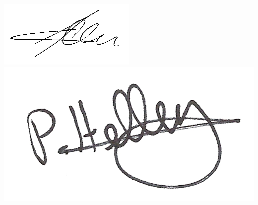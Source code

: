 \documentclass[a4paper,10pt]{article}
\begin{document}
\begin{flushright}
\includegraphics[width=.30\textwidth]{sign_clauss.jpg}
\includegraphics[width=.30\textwidth]{sign_helluy.jpg} 
\end{flushright}
%
%
\end{document}
